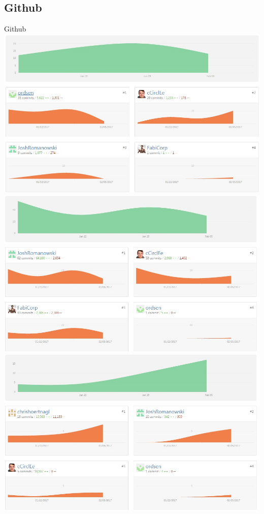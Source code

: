 \documentclass[19pt]{beamer}
\begin{document}
\subsection{Github}
\begin{frame}{Github}
\includegraphics[scale=0.15]{resources/GithubApp.jpg}
\includegraphics[scale=0.15]{resources/GithubService.jpg} \\
\includegraphics[scale=0.15]{resources/GithubInterface.jpg}

\end{frame}
\end{document}
